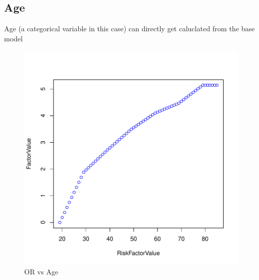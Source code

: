 \documentclass{report}
\begin{document}
\subsection{\color{green}Age}
Age (a categorical variable in this case) can directly get caluclated from the base model
\begin{center}
\begin{figure}[H]
\includegraphics{EPFL-Age}
\caption{OR vs Age}
\end{figure}
\end{center}

\newpage
\end{document}
